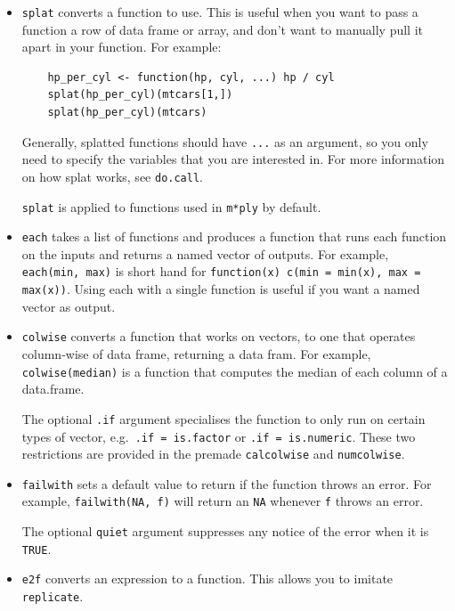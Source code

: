 \documentclass[letterpaper,oneside]{scrartcl}
\begin{document}
\begin{itemize}
  \item {\tt splat} converts a function to use.  This is useful when you want to pass a function a row of data frame or array, and don't want to manually pull it apart in your function.  For example:
  
  \begin{verbatim}
    hp_per_cyl <- function(hp, cyl, ...) hp / cyl
    splat(hp_per_cyl)(mtcars[1,])
    splat(hp_per_cyl)(mtcars)
  \end{verbatim} 
  
  Generally, splatted functions should have {\tt ...} as an argument, so you only need to specify the variables that you are interested in.  For more information on how splat works, see {\tt do.call}.  
  
  {\tt splat} is applied to functions used in {\tt m*ply} by default.

  \item {\tt each} takes a list of functions and produces a function that runs  each function on the inputs and returns a named vector of outputs.   For example, {\tt each(min, max)} is short hand for {\tt function(x) c(min = min(x), max = max(x))}.  Using each with a single function is useful if you want a named vector as output.

  \item {\tt colwise} converts a function that works on vectors, to one that operates column-wise of data frame, returning a data fram.  For example, {\tt colwise(median)} is a function that computes the median of each column of a data.frame.  
  
  The optional {\tt .if} argument specialises the function to only run on certain types of vector, e.g.\ {\tt .if = is.factor} or {\tt .if = is.numeric}.  These two restrictions are provided in the premade {\tt calcolwise} and {\tt numcolwise}.  
  
  \item {\tt failwith} sets a default value to return if the function throws an error.  For example, {\tt failwith(NA, f)} will return an {\tt NA} whenever {\tt f} throws an error.  
  
  The optional {\tt quiet} argument suppresses any notice of the error when it is {\tt TRUE}.

  \item {\tt e2f} converts an expression to a function.  This allows you to imitate {\tt replicate}.

\end{itemize}
\end{document}
